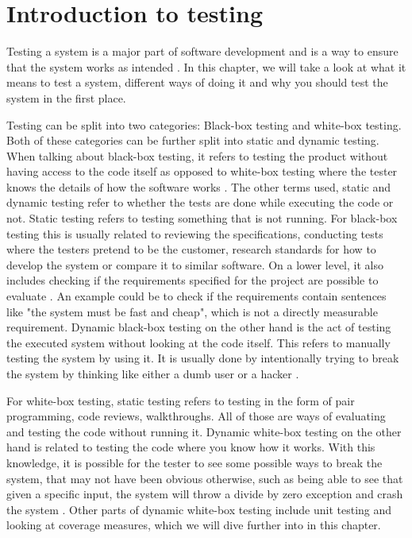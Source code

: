 \section{Introduction to testing}
Testing a system is a major part of software development and is a way to ensure that the system works as intended \cite{SoftwareTesting}.
In this chapter, we will take a look at what it means to test a system, different ways of doing it and why you should test the system in the first place.

Testing can be split into two categories: Black-box testing and white-box testing. Both of these categories can be further split into static and dynamic testing.
When talking about black-box testing, it refers to testing the product without having access to the code itself as opposed to white-box testing where the tester knows the details of how the software works \cite{SoftwareTesting}.
The other terms used, static and dynamic testing refer to whether the tests are done while executing the code or not.
Static testing refers to testing something that is not running. For black-box testing this is usually related to reviewing the specifications, conducting tests where the testers pretend to be the customer, research standards for how to develop the system or compare it to similar software.
On a lower level, it also includes checking if the requirements specified for the project are possible to evaluate \cite{ToVSlides1}.
An example could be to check if the requirements contain sentences like "the system must be fast and cheap", which is not a directly measurable requirement.
Dynamic black-box testing on the other hand is the act of testing the executed system without looking at the code itself. This refers to manually testing the system by using it. It is usually done by intentionally trying to break the system by thinking like either a dumb user or a hacker \cite{SoftwareTesting}.

For white-box testing, static testing refers to testing in the form of pair programming, code reviews, walkthroughs.
All of those are ways of evaluating and testing the code without running it.
Dynamic white-box testing on the other hand is related to testing the code where you know how it works. With this knowledge, it is possible for the tester to see some possible ways to break the system, that may not have been obvious otherwise, such as being able to see that given a specific input, the system will throw a divide by zero exception and crash the system \cite{ToVSlides1}.
Other parts of dynamic white-box testing include unit testing and looking at coverage measures, which we will dive further into in this chapter.
